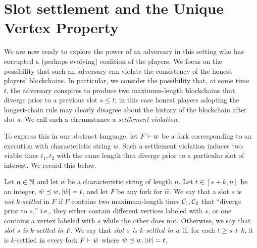 

\section{Slot settlement and the Unique Vertex Property}\label{sec:model-settlement}
  
  We are now ready to explore the power of an adversary in this
  setting who has corrupted a (perhaps evolving) coalition of the
  players. We focus on the possibility that such an adversary can
  violate the consistency of the honest players'
  blockchains. In particular, we consider the possibility that, at
  some time $t$, the adversary conspires to produce two maximum-length blockchains 
  that diverge prior to a previous slot $s \leq t$; in
  this case honest players adopting the longest-chain rule may clearly
  disagree about the history of the blockchain after slot $s$. We call
  such a circumstance a \emph{settlement violation}.

  To express this in our abstract language, let $F \vdash w$ be a fork
  corresponding to an execution with characteristic string $w$. Such a
  settlement violation induces two viable tines $t_1, t_2$ with the
  same length that diverge prior to a particular slot of interest. We
  record this below.
    
  \begin{definition}\label{def:settlement-mh}
    Let $n \in \mathbb{N}$ and let $w$ be a characteristic string of length $n$. 
    Let $t \in [s + k, n]$ be an integer, $\hat{w} \preceq w, |\hat{w}| = t$, and 
    let $F$ be any fork for $\hat{w}$. 
    We say that a slot $s$ is \emph{not $k$-settled} in $F$ if 
    $F$ contains two maximum-length tines $\mathcal{C}_1, \mathcal{C}_2$ 
    that ``diverge prior to $s$,'' i.e., they either
    contain different vertices labeled with $s$, or one contains a
    vertex labeled with $s$ while the other does not. 
    Otherwise, we say that \emph{slot $s$ is $k$-settled in $F$}. 
    We say that \emph{slot $s$ is $k$-settled in $w$} if, 
    for each $t \geq s+k$, 
    it is $k$-settled in every fork $F \vdash \hat{w}$ where $\hat{w} \preceq w, |\hat{w}| = t$.
  \end{definition}




